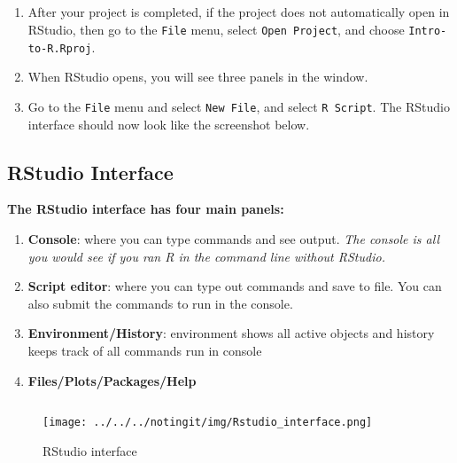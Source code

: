 \documentclass[
]{article}
\providecommand{\tightlist}{%
  \setlength{\itemsep}{0pt}\setlength{\parskip}{0pt}}
\begin{document}
\hypertarget{section-4}{%
\subsection{}\label{section-4}}

\begin{enumerate}
\def\labelenumi{\arabic{enumi}.}
\setcounter{enumi}{4}
\tightlist
\item
  After your project is completed, if the project does not automatically
  open in RStudio, then go to the \texttt{File} menu, select
  \texttt{Open\ Project}, and choose \texttt{Intro-to-R.Rproj}.
\item
  When RStudio opens, you will see three panels in the window.
\item
  Go to the \texttt{File} menu and select \texttt{New\ File}, and select
  \texttt{R\ Script}. The RStudio interface should now look like the
  screenshot below.
\end{enumerate}

\hypertarget{rstudio-interface}{%
\subsection{RStudio Interface}\label{rstudio-interface}}

\textbf{The RStudio interface has four main panels:}

\begin{enumerate}
\def\labelenumi{\arabic{enumi}.}
\tightlist
\item
  \textbf{Console}: where you can type commands and see output.
  \emph{The console is all you would see if you ran R in the command
  line without RStudio.}
\item
  \textbf{Script editor}: where you can type out commands and save to
  file. You can also submit the commands to run in the console.
\item
  \textbf{Environment/History}: environment shows all active objects and
  history keeps track of all commands run in console
\item
  \textbf{Files/Plots/Packages/Help}
\end{enumerate}

\hypertarget{section-5}{%
\subsection{}\label{section-5}}

\begin{figure}
\centering
\texttt{[image: ../../../notingit/img/Rstudio\_interface.png]}
\caption{RStudio interface}
\end{figure}
\end{document}
